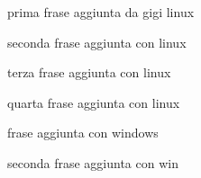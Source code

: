 \documentclass[a4paper]{article}
\begin{document}
prima frase aggiunta da gigi linux

seconda frase aggiunta con linux

terza frase aggiunta con linux

quarta frase aggiunta con linux

frase aggiunta con windows

seconda frase aggiunta con win
\end{document}
